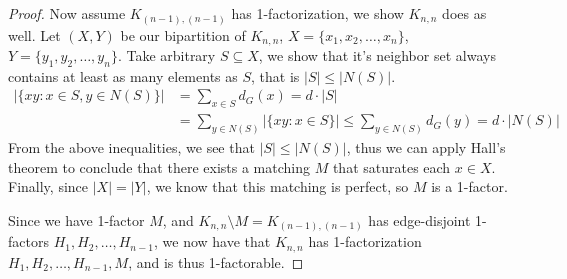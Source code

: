 \documentclass[11pt]{article}
\newcommand{\n}{\vspace{0.3cm}}
\begin{document}
\begin{itemize}
\begin{enumerate}[label=(\alph*)]
\begin{enumerate}[label=(\roman*)]
\begin{itemize}
\begin{proof}
                  Now assume \(K_{(n-1),(n-1)}\) has 1-factorization, we show \(K_{n,n}\) does as well.  Let \((X,Y)\) be our bipartition of \(K_{n,n}\), \(X = \{x_1, x_2, \hdots, x_n\}\), \(Y = \{y_1, y_2, \hdots, y_n\}\).  Take arbitrary \(S \subseteq X\), we show that it's neighbor set always contains at least as many elements as \(S\), that is \(|S| \leq |N(S)|\).
                  \begin{align*}
                    |\{xy \colon x \in S, y \in N(S)\}| &= \sum_{x \in S} d_G(x) = d \cdot |S| \\
                                                      &= \sum_{y \in N(S)} |\{xy \colon x \in S\}| \leq \sum_{y \in N(S)} d_G(y) = d \cdot |N(S)|
                  \end{align*}
                  From the above inequalities, we see that \(|S| \leq |N(S)|\), thus we can apply Hall's theorem to conclude that there exists a matching \(M\) that saturates each \(x \in X\).  Finally, since \(|X| = |Y|\), we know that this matching is perfect, so \(M\) is a 1-factor.  \n

                  Since we have 1-factor \(M\), and \(K_{n,n} \setminus M = K_{(n-1),(n-1)}\) has edge-disjoint 1-factors \(H_1, H_2, \hdots, H_{n-1}\), we now have that \(K_{n,n}\) has 1-factorization \(H_1, H_2, \hdots, H_{n-1}, M\), and is thus 1-factorable.



                \end{proof}


\end{itemize}
\end{enumerate}
\end{enumerate}
\end{itemize}
\end{document}
